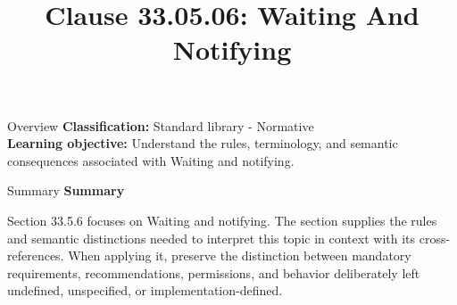 \documentclass[10pt,letterpaper]{article}
\title{Clause 33.05.06: Waiting And Notifying}
\author{}
\date{}
\begin{document}
\maketitle
\begin{CornellOverviewBox}{Overview}
\textbf{Classification:} Standard library - Normative\\[2pt]
\textbf{Learning objective:} Understand the rules, terminology, and semantic consequences associated with Waiting and notifying.
\end{CornellOverviewBox}\begin{CornellSummaryBox}{Summary}
{\sffamily\bfseries\color{Accent} Summary}\par\vspace{3pt}Section 33.5.6 focuses on Waiting and notifying. The section supplies the rules and semantic distinctions needed to interpret this topic in context with its cross-references. When applying it, preserve the distinction between mandatory requirements, recommendations, permissions, and behavior deliberately left undefined, unspecified, or implementation-defined.
\end{CornellSummaryBox}
\end{document}
